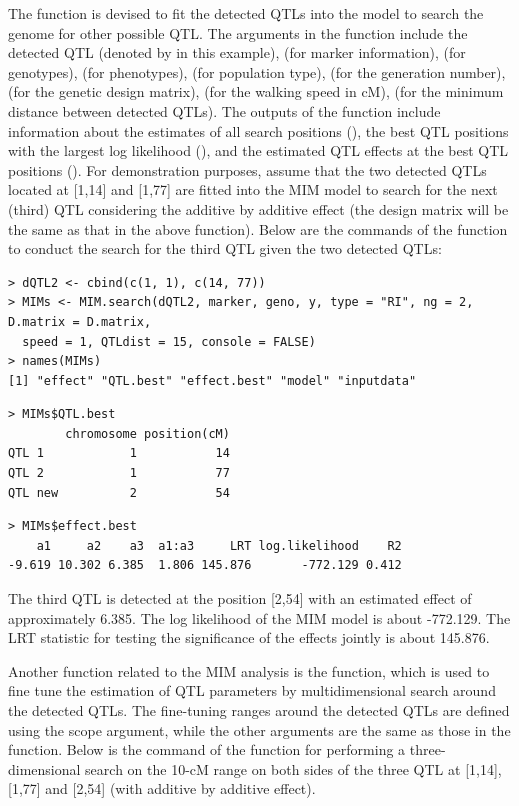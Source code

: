 The  function is devised to fit the detected QTLs into the model to search the genome for other possible QTL. The arguments in the  function include the detected QTL (denoted by  in this example),  (for marker information),  (for genotypes),  (for phenotypes),  (for population type),  (for the generation number),  (for the genetic design matrix),  (for the walking speed in cM),  (for the minimum distance between detected QTLs). The outputs of the  function include information about the estimates of all search positions (), the best QTL positions with the largest log likelihood (), and the estimated QTL effects at the best QTL positions (). For demonstration purposes, assume that the two detected QTLs located at [1,14] and [1,77] are fitted into the MIM model to search for the next (third) QTL considering the additive by additive effect (the design matrix will be the same as that in the above  function). Below are the commands of the  function to conduct the search for the third QTL given the two detected QTLs:

\begin{verbatim}
> dQTL2 <- cbind(c(1, 1), c(14, 77))
> MIMs <- MIM.search(dQTL2, marker, geno, y, type = "RI", ng = 2, D.matrix = D.matrix,
  speed = 1, QTLdist = 15, console = FALSE)
> names(MIMs)
[1] "effect" "QTL.best" "effect.best" "model" "inputdata"  
\end{verbatim}

\begin{verbatim}
> MIMs$QTL.best
        chromosome position(cM)
QTL 1            1           14
QTL 2            1           77
QTL new          2           54
\end{verbatim}

\begin{verbatim}
> MIMs$effect.best
    a1     a2    a3  a1:a3     LRT log.likelihood    R2
-9.619 10.302 6.385  1.806 145.876       -772.129 0.412
\end{verbatim}

\noindent The third QTL is detected at the position [2,54] with an estimated effect of approximately 6.385. The log likelihood of the MIM model is about -772.129. The LRT statistic for testing the significance of the effects jointly is about 145.876. 

Another function related to the MIM analysis is the  function, which is used to fine tune the estimation of QTL parameters by multidimensional search around the detected QTLs. The fine-tuning ranges around the detected QTLs are defined using the scope argument, while the other arguments are the same as those in the  function. Below is the command of the  function for performing a three-dimensional search on the 10-cM range on both sides of the three QTL at [1,14], [1,77] and [2,54] (with additive by additive effect).

